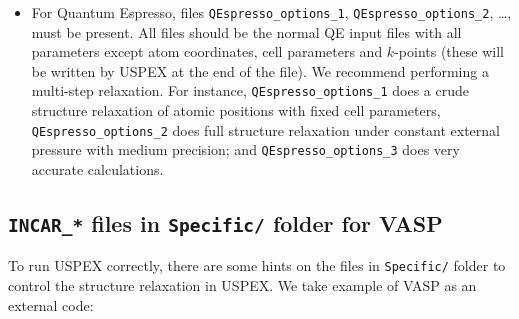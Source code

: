 \documentclass[12pt]{article}
\newcommand{\file}[1]{\texttt{#1}}
\begin{document}
\begin{itemize}
\item For Quantum Espresso, files \file{QEspresso\_options\_1},
\file{QEspresso\_options\_2}, \ldots, must be present. All files should be the
normal QE input files with all parameters except atom coordinates, cell
parameters and $k$-points (these will be written by USPEX at the end of the
file). We recommend performing a multi-step relaxation. For instance,
\file{QEspresso\_options\_1} does a crude structure relaxation of atomic
positions with fixed cell parameters, \file{QEspresso\_options\_2} does full
structure relaxation under constant external pressure with medium precision; and
\file{QEspresso\_options\_3} does very accurate calculations.
\end{itemize}


\subsection{\file{INCAR\_*} files in \file{Specific/} folder for VASP}

To run USPEX correctly, there are some hints on the files in \file{Specific/}
folder to control the structure relaxation in USPEX. We take example of VASP as
an external code:
\end{document}
